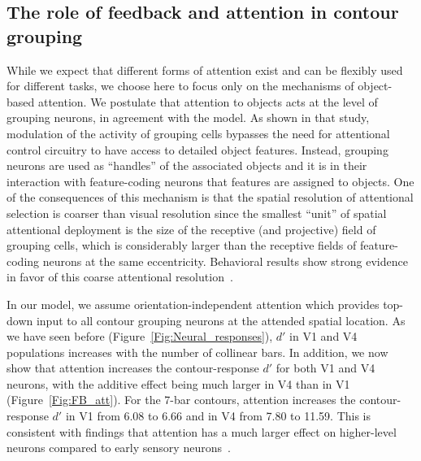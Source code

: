 \subsection{The role of feedback and attention in contour grouping}   
While we expect that different forms of attention exist and can be
flexibly used for different tasks, we choose here to focus only on the mechanisms of object-based attention. We postulate that attention to objects acts at the level of grouping neurons, in agreement with the \cite{Mihalas_etal11b} model. As shown in that study, modulation of the activity of grouping cells bypasses the need for attentional control circuitry to have access to detailed object features.  Instead, grouping
neurons are used as ``handles'' of the associated objects and it is in
their interaction with feature-coding neurons that features are assigned to objects. One of the consequences of this mechanism is that
the spatial resolution of attentional selection is coarser than visual
resolution since the smallest ``unit'' of spatial attentional deployment is the size of the receptive (and projective) field of grouping cells, which is considerably larger than the receptive fields
of feature-coding neurons at the same eccentricity. Behavioral results
show strong evidence in favor of this coarse attentional resolution~\citep{Intriligator_Cavanagh01}.

In our model, we assume orientation-independent attention which provides top-down input to all contour grouping neurons at the attended
spatial location. As we have seen before (Figure~\ref{Fig:Neural_responses}), $d'$ in V1 and V4 populations increases with the number of collinear bars. In addition, we now show that attention increases the contour-response $d'$ for both V1 and V4 neurons, with the additive effect being much larger in V4 than in V1
(Figure~\ref{Fig:FB_att}). For the 7-bar contours, attention increases
the contour-response $d'$ in V1 from 6.08 to 6.66 and in V4 from 7.80
to 11.59. This is consistent with findings that attention has a much
larger effect on higher-level neurons compared to early sensory
neurons~\citep[review:][]{Treue01}.

